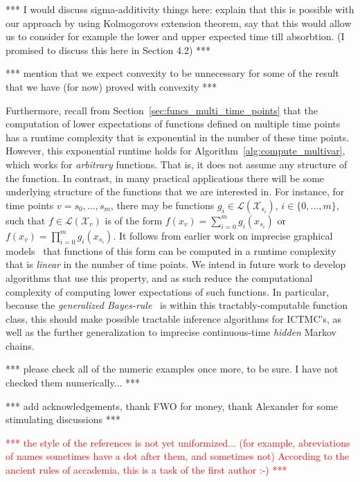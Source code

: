 \documentclass[10pt,a4paper]{paper}
\theoremstyle{definition}
\newcommand{\states}{\mathcal{X}}
\newcommand{\gambles}{\mathcal{L}}
\newcommand{\ictmc}{{ICTMC}}
\begin{document}
*** I would discuss sigma-additivity things here: explain that this is possible with our approach by using Kolmogorovs extension theorem, say that this would allow us to consider for example the lower and upper expected time till absorbtion. (I promised to discuss this here in Section 4.2) ***

*** mention that we expect convexity to be unnecessary for some of the result that we have (for now) proved with convexity ***

Furthermore, recall from Section~\ref{sec:funcs_multi_time_points} that the computation of lower expectations of functions defined on multiple time points has a runtime complexity that is exponential in the number of these time points. However, this exponential runtime holds for Algorithm~\ref{alg:compute_multivar}, which works for \emph{arbitrary} functions. That is, it does not assume any structure of the function. In contrast, in many practical applications there will be some underlying structure of the functions that we are interested in. For instance, for time points $v=s_0,\ldots,s_m$, there may be functions $g_i\in\gambles(\states_{s_i})$, $i\in\{0,\ldots,m\}$, such that $f\in\gambles(\states_v)$ is of the form $f(x_v) = \sum_{i=0}^m g_i(x_{s_i})$ or $f(x_v) = \prod_{i=0}^m g_i(x_{s_i})$. It follows from earlier work on imprecise graphical models~\cite{de2015credal} that functions of this form can be computed in a runtime complexity that is \emph{linear} in the number of time points. We intend in future work to develop algorithms that use this property, and as such reduce the computational complexity of computing lower expectations of such functions. In particular, because the \emph{generalized Bayes-rule}~\cite{Walley:1991vk} is within this tractably-computable function class, this should make possible tractable inference algorithms for \ictmc's, as well as the further generalization to imprecise continuous-time \emph{hidden} Markov chains.

*** please check all of the numeric examples once more, to be sure. I have not checked them numerically... ***

*** add acknowledgements, thank FWO for money, thank Alexander for some stimulating discussions ***

\textcolor{red}{*** the style of the references is not yet uniformized... (for example, abreviations of names sometimes have a dot after them, and sometimes not) According to the ancient rules of accademia, this is a task of the first author :-) ***}
\end{document}
